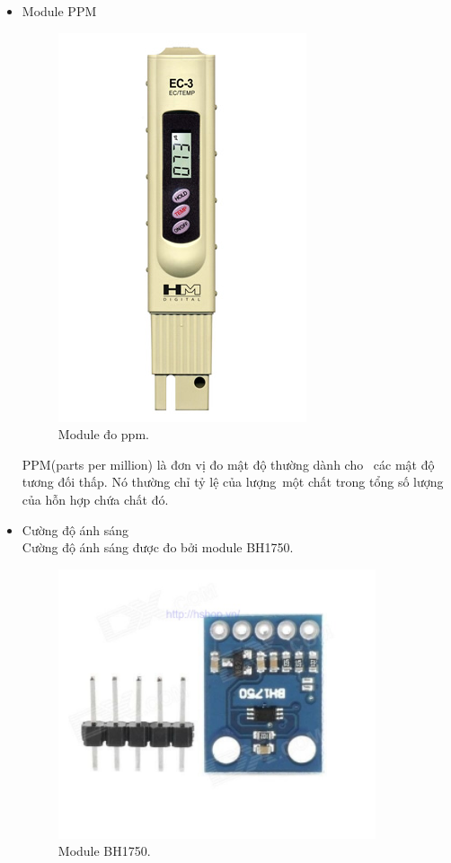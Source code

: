 \documentclass[a4paper,12pt,oneside]{article}
\begin{document}
\begin{itemize}
\item Module PPM
\begin{center}
\begin{figure}[h!]
\begin{center}
\includegraphics[scale=.5]{hinh/tds.jpg}
\end{center}
\caption{Module đo ppm.}

\end{figure}
\end{center}
PPM(parts per million) là đơn vị đo mật độ thường dành cho \
các mật độ tương đối thấp. Nó thường chỉ tỷ lệ của lượng\
một chất trong tổng số lượng của hỗn hợp chứa chất đó.\\

\item Cường độ ánh sáng\\
\noindent Cường độ ánh sáng được đo bởi module BH1750.
\begin{figure}[h!]
\centering
\includegraphics[scale=.8]{hinh/BH175.png}
\caption{Module BH1750.}
\end{figure}


\end{itemize}
\end{document}

